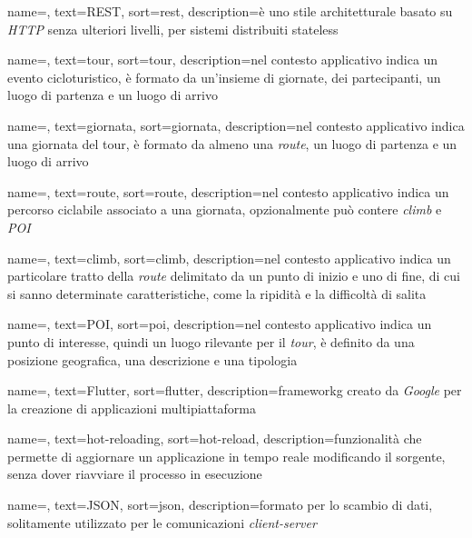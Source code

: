 {
    name=,
    text=REST,
    sort=rest,
    description={è uno stile architetturale basato su \textit{HTTP} senza ulteriori livelli, per sistemi distribuiti stateless}
}

{
    name=,
    text=tour,
    sort=tour,
    description={nel contesto applicativo indica un evento cicloturistico, è formato da un'insieme di giornate, dei partecipanti, un luogo di partenza e un luogo di arrivo}
}

{
    name=,
    text=giornata,
    sort=giornata,
    description={nel contesto applicativo indica una giornata del tour, è formato da almeno una \textit{route}, un luogo di partenza e un luogo di arrivo}
}

{
    name=,
    text=route,
    sort=route,
    description={nel contesto applicativo indica un percorso ciclabile associato a una giornata, opzionalmente può contere \textit{climb} e \textit{POI}}
}

{
    name=,
    text=climb,
    sort=climb,
    description={nel contesto applicativo indica un particolare tratto della \textit{route} delimitato da un punto di inizio e uno di fine, di cui si sanno determinate caratteristiche, come la ripidità e la difficoltà di salita}
}

{
    name=,
    text=POI,
    sort=poi,
    description={nel contesto applicativo indica un punto di interesse, quindi un luogo rilevante per il \textit{tour}, è definito da una posizione geografica, una descrizione e una tipologia}
}


{
    name=,
    text=Flutter,
    sort=flutter,
    description={\gls{frameworkg} creato da \textit{Google} per la creazione di applicazioni multipiattaforma}
}

{
    name=,
    text=hot-reloading,
    sort=hot-reload,
    description={funzionalità che permette di aggiornare un applicazione in tempo reale modificando il sorgente, senza dover riavviare il processo in esecuzione}
}

{
    name=,
    text=JSON,
    sort=json,
    description={formato per lo scambio di dati, solitamente utilizzato per le comunicazioni \textit{client-server}}
}

